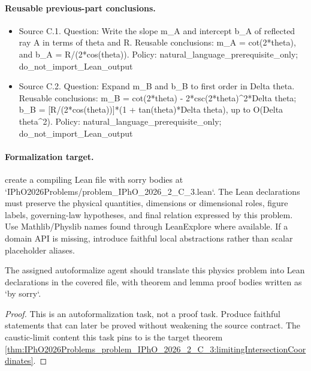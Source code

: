 \paragraph{Reusable previous-part conclusions.}
\begin{itemize}
\item Source C.1. Question: Write the slope m\_A and intercept b\_A of reflected ray A in terms of theta and R. Reusable conclusions: m\_A = cot(2*theta), and b\_A = R/(2*cos(theta)). Policy: natural\_language\_prerequisite\_only; do\_not\_import\_Lean\_output
\item Source C.2. Question: Expand m\_B and b\_B to first order in Delta theta. Reusable conclusions: m\_B = cot(2*theta) - 2*csc(2*theta)\textasciicircum{}2*Delta theta; b\_B = [R/(2*cos(theta))]*(1 + tan(theta)*Delta theta), up to O(Delta theta\textasciicircum{}2). Policy: natural\_language\_prerequisite\_only; do\_not\_import\_Lean\_output
\end{itemize}

\paragraph{Formalization target.}
create a compiling Lean file with sorry bodies at `IPhO2026Problems/problem\_IPhO\_2026\_2\_C\_3.lean`.
The Lean declarations must preserve the physical quantities, dimensions or dimensional roles, figure labels, governing-law hypotheses, and final relation expressed by this problem.
Use Mathlib/Physlib names found through LeanExplore where available. If a domain API is missing, introduce faithful local abstractions rather than scalar placeholder aliases.

\begin{theorem}
\label{thm:physics:IPhO_2026_2_C_3:target}
The assigned autoformalize agent should translate this physics problem into Lean declarations in the covered file, with theorem and lemma proof bodies written as `by sorry`.
\end{theorem}
\begin{proof}
This is an autoformalization task, not a proof task. Produce faithful statements that can later be proved without weakening the source contract. The caustic-limit content this task pins to is the target theorem \cref{thm:IPhO2026Problems_problem_IPhO_2026_2_C_3:limitingIntersectionCoordinates}.
\end{proof}

